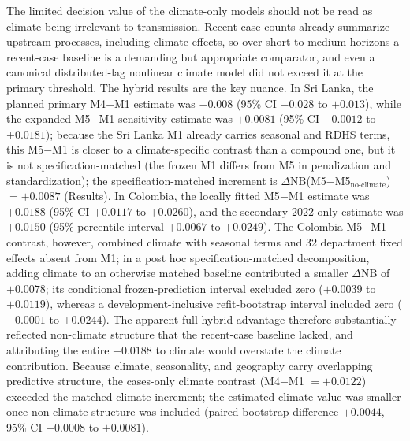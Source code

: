 \documentclass[11pt,a4paper]{article}
\begin{document}
The limited decision value of the climate-only models should not be read as climate being irrelevant to transmission. Recent case counts already summarize upstream processes, including climate effects, so over short-to-medium horizons a recent-case baseline is a demanding but appropriate comparator, and even a canonical distributed-lag nonlinear climate model did not exceed it at the primary threshold. The hybrid results are the key nuance. In Sri Lanka, the planned primary M4$-$M1 estimate was $-0.008$ (95\% CI $-0.028$ to $+0.013$), while the expanded M5$-$M1 sensitivity estimate was $+0.0081$ (95\% CI $-0.0012$ to $+0.0181$); because the Sri Lanka M1 already carries seasonal and RDHS terms, this M5$-$M1 is closer to a climate-specific contrast than a compound one, but it is not specification-matched (the frozen M1 differs from M5 in penalization and standardization); the specification-matched increment is $\Delta$NB(M5$-$M5$_{\text{no-climate}}$) $=+0.0087$ (Results). In Colombia, the locally fitted M5$-$M1 estimate was $+0.0188$ (95\% CI $+0.0117$ to $+0.0260$), and the secondary 2022-only estimate was $+0.0150$ (95\% percentile interval $+0.0067$ to $+0.0249$). The Colombia M5$-$M1 contrast, however, combined climate with seasonal terms and 32 department fixed effects absent from M1; in a post hoc specification-matched decomposition, adding climate to an otherwise matched baseline contributed a smaller $\Delta$NB of $+0.0078$; its conditional frozen-prediction interval excluded zero ($+0.0039$ to $+0.0119$), whereas a development-inclusive refit-bootstrap interval included zero ($-0.0001$ to $+0.0244$). The apparent full-hybrid advantage therefore substantially reflected non-climate structure that the recent-case baseline lacked, and attributing the entire $+0.0188$ to climate would overstate the climate contribution. Because climate, seasonality, and geography carry overlapping predictive structure, the cases-only climate contrast (M4$-$M1 $=+0.0122$) exceeded the matched climate increment; the estimated climate value was smaller once non-climate structure was included (paired-bootstrap difference $+0.0044$, 95\% CI $+0.0008$ to $+0.0081$).
\end{document}
